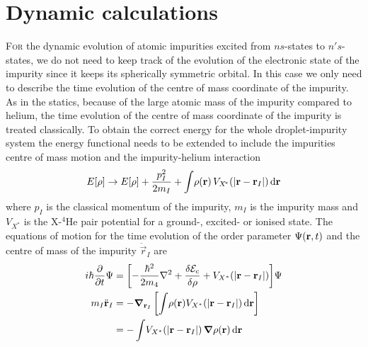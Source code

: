 	\section{Dynamic calculations}
		\lettrine[lines=3,findent=3pt,nindent=0pt]{F}{or} the dynamic evolution of atomic impurities excited from $ns$-states to $n's$-states, we do not need to keep track of the evolution of the electronic state of the impurity since it keeps its spherically symmetric orbital. In this case we only need to describe the time evolution of the centre of mass coordinate of the impurity. As in the statics, because of the large atomic mass of the impurity compared to helium, the time evolution of the centre of mass coordinate of the impurity is treated classically. To obtain the correct energy for the whole droplet-impurity system the energy functional needs to be extended to include the impurities centre of mass motion and the impurity-helium interaction
		\begin{align}
			E[\rho] \rightarrow E[\rho] + \frac{p^2_I}{2 m_I} + \int \! \rho(\mathbf{r}) \, V_{X^{\!*}}\qty(\abs{\bm{\mathrm{r}}-\bm{\mathrm{r}}_I})\,\mathrm{d}{\bm{\mathrm{r}}} \label{eq33}
		\end{align}
		where $p_I$ is the classical momentum of the impurity, $m_I$ is the impurity mass and $V_{X^{\!*}}$ is the X-$^4$He pair potential for a ground-, excited- or ionised state. The equations of motion for the time evolution of the order parameter $\Psi\qty(\bm{\mathrm{r}},t)$ and the centre of mass of the impurity $\ddot{\vec{r}}_I$ are  
		\begin{align}
			i\hbar\frac{\partial}{\partial t} \Psi &= \qty[-\frac{\hbar^2}{2m_4} \laplacian +\frac{\delta {\cal E}_c}{\delta \rho} + V_{X^*}(|\mathbf{r}- \mathbf{r}_I|)]\Psi\nonumber\\
			m_I \ddot{\mathbf{r}}_I &= - \grad_{\vec{r}_I} \left[  \int \!\rho(\mathbf{r}) V_{X^*}(|\mathbf{r}- \mathbf{r}_I|)\diff{r}  \right] \nonumber \\
			&= -\int \! V_{X^*}(|\mathbf{r}- \mathbf{r}_I|)  \, \grad \rho(\mathbf{r})\diff{r} \label{eq34}
		\end{align}
	
